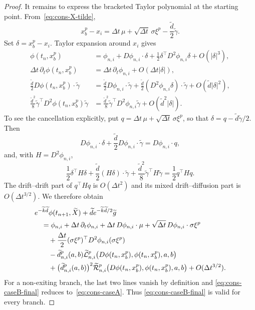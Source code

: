 \documentclass[10pt,a4paper]{amsart}
\begin{document}
\begin{proof}
		It remains to express the bracketed Taylor polynomial at the starting point.
		From~\eqref{eq:cons-X-tilde},
		\begin{equation}
			x_b^p-x_i=\Delta t\,\mu+\sqrt{\Delta t}\,\sigma\xi^p
			-\frac{\widetilde d}{2}\widetilde\gamma.
			\label{eq:xb-xi-relation}
		\end{equation}
		Set $\delta=x_b^p-x_i$.  Taylor expansion around $x_i$ gives
		\begin{align*}
			\phi(t_n,x_b^p)
			&=\phi_{n,i}+D\phi_{n,i}\cdot\delta
			+\frac12\delta^\top D^2\phi_{n,i}\delta+O(|\delta|^3),\\
			\Delta t\,\partial_t\phi(t_n,x_b^p)
			&=\Delta t\,\partial_t\phi_{n,i}+O(\Delta t|\delta|),\\
			\frac{\widetilde d}{2}D\phi(t_n,x_b^p)\cdot\widetilde\gamma
			&=\frac{\widetilde d}{2}D\phi_{n,i}\cdot\widetilde\gamma
			+\frac{\widetilde d}{2}(D^2\phi_{n,i}\delta)\cdot\widetilde\gamma
			+O(\widetilde d|\delta|^2),\\
			\frac{\widetilde d^2}{8}\widetilde\gamma^\top
			D^2\phi(t_n,x_b^p)\widetilde\gamma
			&=\frac{\widetilde d^2}{8}\widetilde\gamma^\top
			D^2\phi_{n,i}\widetilde\gamma+O(\widetilde d^2|\delta|).
		\end{align*}
		To see the cancellation explicitly, put
		$q=\Delta t\,\mu+\sqrt{\Delta t}\,\sigma\xi^p$, so that
		$\delta=q-\widetilde d\widetilde\gamma/2$.  Then
		\[
		D\phi_{n,i}\cdot\delta
		+\frac{\widetilde d}{2}D\phi_{n,i}\cdot\widetilde\gamma
		=D\phi_{n,i}\cdot q,
		\]
		and, with $H=D^2\phi_{n,i}$,
		\[
		\frac12\delta^\top H\delta
		+\frac{\widetilde d}{2}(H\delta)\cdot\widetilde\gamma
		+\frac{\widetilde d^2}{8}\widetilde\gamma^\top H\widetilde\gamma
		=\frac12q^\top Hq.
		\]
		The drift--drift part of $q^\top Hq$ is $O(\Delta t^2)$ and its mixed
		drift--diffusion part is $O(\Delta t^{3/2})$.  We therefore obtain
		\begin{align}
			&e^{-\widetilde k\widetilde d}\phi(t_{n+1},\widetilde X)
			+\widetilde d e^{-\widetilde k\widetilde d/2}\widetilde g
			\notag\\
			&\quad=\phi_{n,i}+\Delta t\,\partial_t\phi_{n,i}
			+\Delta t\,D\phi_{n,i}\cdot\mu
			+\sqrt{\Delta t}\,D\phi_{n,i}\cdot\sigma\xi^p
			\notag\\
			&\qquad+\frac{\Delta t}{2}(\sigma\xi^p)^\top
			D^2\phi_{n,i}(\sigma\xi^p)
			\notag\\
			&\qquad-\widetilde d_{n,i}^p(a,b)
			\widetilde{\mathcal L}_{n,i}^p
			\bigl(D\phi(t_n,x_b^p),\phi(t_n,x_b^p),a,b\bigr)
			\notag\\
			&\qquad+\bigl(\widetilde d_{n,i}^p(a,b)\bigr)^2
			\widetilde{\mathcal R}_{n,i}^p
			\bigl(D\phi(t_n,x_b^p),\phi(t_n,x_b^p),a,b\bigr)
			+O(\Delta t^{3/2}).
			\label{eq:cons-caseB-final}
		\end{align}
		For a non-exiting branch, the last two lines vanish by definition and
		\eqref{eq:cons-caseB-final} reduces to~\eqref{eq:cons-caseA}.  Thus
		\eqref{eq:cons-caseB-final} is valid for every branch.
		

\end{proof}
\end{document}

